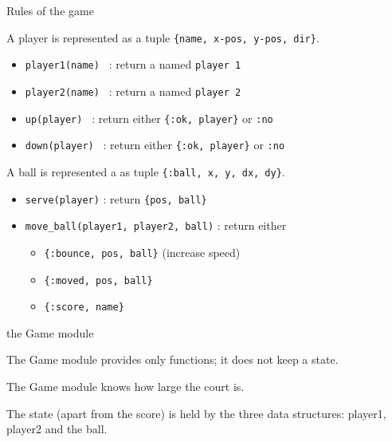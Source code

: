 \begin{frame}{Rules of the game}

  \pause A player is represented as a tuple {\tt \{name, x-pos, y-pos, dir\}}.
  \vspace{10pt}

  \begin{itemize}
  \item {\tt player1(name) } : return a named {\tt player 1} 
  \item {\tt player2(name) } : return a named {\tt player 2}  \pause   
  \item {\tt up(player) } : return either {\tt \{:ok, player\}} or {\tt :no} 
  \item {\tt down(player) } : return either {\tt \{:ok, player\}} or {\tt :no} \pause
  \end{itemize}
  \vspace{10pt}      
  \pause A ball is represented a as tuple {\tt \{:ball, x, y, dx, dy\}}.  \pause
  \vspace{10pt}      
  \begin{itemize}
  \item {\tt serve(player)} : return {\tt \{pos, ball\}} \pause
  \item {\tt move_ball(player1, player2, ball)} : return either \pause
    \begin{itemize}
      \item {\tt \{:bounce, pos, ball\}}  (increase speed) \pause
      \item {\tt \{:moved, pos, ball\}} \pause
      \item {\tt \{:score, name\}}\pause
    \end{itemize}
  
  \end{itemize}
  
\end{frame}

\begin{frame}{the Game module}

  The Game module provides only functions; it does not keep a state. 

  \vspace{20pt}\pause
  The Game module knows how large the court is.
  
  \vspace{20pt}\pause
  The state (apart from the score) is held by the three data structures: player1, player2 and the ball.

\end{frame}





